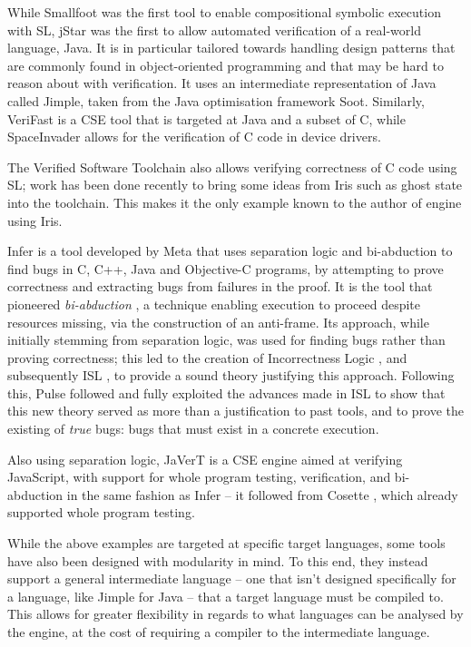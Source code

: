 While Smallfoot \cite{smallfoot} was the first tool to enable compositional symbolic execution with SL, jStar \cite{jstar} was the first to allow automated verification of a real-world language, Java. It is in particular tailored towards handling design patterns that are commonly found in object-oriented programming and that may be hard to reason about with verification. It uses an intermediate representation of Java called Jimple, taken from the Java optimisation framework Soot. Similarly, VeriFast \cite{verifast} is a CSE tool that is targeted at Java and a subset of C, while SpaceInvader \cite{spaceinvader} allows for the verification of C code in device drivers.

The Verified Software Toolchain \cite{vstiris} also allows verifying correctness of C code using SL; work has been done recently to bring some ideas from Iris such as ghost state into the toolchain. This makes it the only example known to the author of engine using Iris.

Infer \cite{infer} is a tool developed by Meta that uses separation logic and bi-abduction to find bugs in C, C++, Java and Objective-C programs, by attempting to prove correctness and extracting bugs from failures in the proof. It is the tool that pioneered \emph{bi-abduction} \cite{biabduction}, a technique enabling execution to proceed despite resources missing, via the construction of an anti-frame. Its approach, while initially stemming from separation logic, was used for finding bugs rather than proving correctness; this led to the creation of Incorrectness Logic \cite{incorrectnesslogic}, and subsequently ISL \cite{isl}, to provide a sound theory justifying this approach. Following this, Pulse \cite{pulse} followed and fully exploited the advances made in ISL to show that this new theory served as more than a justification to past tools, and to prove the existing of \emph{true} bugs: bugs that must exist in a concrete execution.

Also using separation logic, JaVerT \cite{javert1, javert2} is a CSE engine aimed at verifying JavaScript, with support for whole program testing, verification, and bi-abduction in the same fashion as Infer -- it followed from Cosette \cite{cosette}, which already supported whole program testing.

While the above examples are targeted at specific target languages, some tools have also been designed with modularity in mind. To this end, they instead support a general intermediate language -- one that isn't designed specifically for a language, like Jimple for Java -- that a target language must be compiled to. This allows for greater flexibility in regards to what languages can be analysed by the engine, at the cost of requiring a compiler to the intermediate language.

